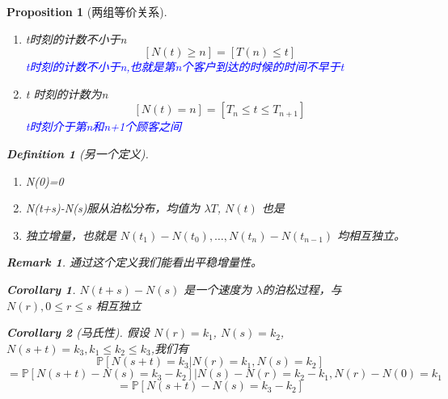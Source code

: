 \documentclass{article}
\newtheorem{definition}{Definition}
\newtheorem{proposition}{Proposition}
\newtheorem{remark}{Remark}
\newtheorem{corollary}{Corollary}
\begin{document}
\begin{proposition}[两组等价关系]
    \begin{enumerate}
        \item t时刻的计数不小于n\[ \left[ N(t) \geqslant n       \right] = \left[ T(n)\leqslant t \right] \]\textcolor{blue}{t时刻的计数不小于n,也就是第n个客户到达的时候的时间不早于t}
        \item t 时刻的计数为n \[ \left[ N(t)=n \right]=\left[ T_n \leqslant t \leqslant T_{n+1} \right] \]\textcolor{blue}{t时刻介于第n和n+1个顾客之间}
    \end{enumerate}
\begin{definition}[另一个定义]
    \begin{enumerate}
        \item N(0)=0
        \item N(t+s)-N(s)服从泊松分布，均值为 $ \lambda T $, $ N(t) $ 也是
        \item 独立增量，也就是 $ N(t_1)-N(t_0),\dots, N(t_{n})-N(t_{n-1}) $ 均相互独立。 
    \end{enumerate}
    
\end{definition}

\begin{remark}
    通过这个定义我们能看出平稳增量性。
\end{remark}



\begin{corollary}
    $ N(t+s) -N(s)$ 是一个速度为 $ \lambda $的泊松过程，与 $ N(r),0 \leqslant r \leqslant s $ 相互独立
\end{corollary}

\begin{corollary}[马氏性]
    假设 $ N(r)=k_1 $, $ N(s)=k_2 $,    $ N(s+t)=k_3 , k_1 \leqslant k_2 \leqslant k_3$,我们有
    \[ \mathbb{P}\left[  N(s+t)=k_3| N(r)=k_1,N(s)=k_2  \right] \]
    \[ =\mathbb{P}\left[ N(s+t)-N(s)=k_3-k_2 \right]|N(s)-N(r)=k_2-k_1,N(r)-N(0)=k_1 \]
    \[ = \mathbb{P}\left[ N(s+t)-N(s)=k_3-k_2 \right] \]
\end{corollary}






\end{proposition}
\end{document}
